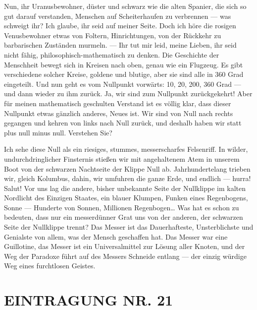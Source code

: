 Nun, ihr Uranusbewohner, düster und schwarz wie die alten Spanier,
die sich so gut darauf verstanden, Menschen auf Scheiterhaufen zu
verbrennen — was schweigt ihr? Ich glaube, ihr seid auf meiner
Seite. Doch ich höre die rosigen Venusbewohner etwas von Foltern,
Hinrichtungen, von der Rückkehr zu barbarischen Zuständen murmeln.
— Ihr tut mir leid, meine Lieben, ihr seid nicht fähig,
philosophisch-mathematisch zu denken. Die Geschichte der Menschheit
bewegt sich in Kreisen nach oben, genau wie ein Flugzeug. Es gibt
verschiedene solcher Kreise, goldene und blutige, aber sie sind
alle in 360 Grad eingeteilt. Und nun geht es vom Nullpunkt
vorwärts: 10, 20, 200, 360 Grad — und dann wieder zu ihm zurück.
Ja, wir sind zum Nullpunkt zurückgekehrt! Aber für meinen
mathematisch geschulten Verstand ist es völlig klar, dass dieser
Nullpunkt etwas gänzlich anderes, Neues ist. Wir sind von Null nach
rechts gegangen und kehren von links nach Null zurück, und deshalb
haben wir statt plus null minus null. Verstehen Sie?

Ich sehe diese Null als ein riesiges, stummes, messerscharfes
Felsenriff. In wilder, undurchdringlicher Finsternis stießen wir
mit angehaltenem Atem in unserem Boot von der schwarzen Nachtseite
der Klippe Null ab. Jahrhundertelang trieben wir, gleich Kolumbus,
dahin, wir umfuhren die ganze Erde, und endlich — hurra! Salut! Vor
uns lag die andere, bisher unbekannte Seite der Nullklippe im
kalten Nordlicht des Einzigen Staates, ein blauer Klumpen, Funken
eines Regenbogens, Sonne — Hunderte von Sonnen, Millionen
Regenbogen\ldots{} Was hat es schon zu bedeuten, dass nur ein
messerdünner Grat uns von der anderen, der schwarzen Seite der
Nullklippe trennt? Das Messer ist das Dauerhafteste, Unsterblichste
und Genialste von allem, was der Mensch geschaffen hat. Das Messer
war eine Guillotine, das Messer ist ein Universalmittel zur Lösung
aller Knoten, und der Weg der Paradoxe führt auf des Messers
Schneide entlang — der einzig würdige Weg eines furchtlosen
Geistes.

\section{EINTRAGUNG NR. 21}

